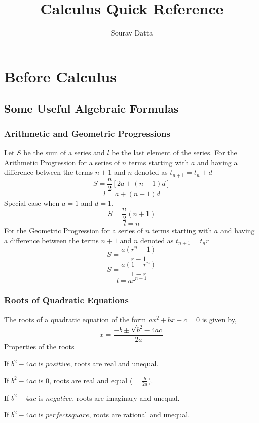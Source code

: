 \documentclass[a4paper]{book}
\title{\LARGE{Calculus Quick Reference}}
\author{Sourav Datta}
\date{}
\begin{document}
\maketitle

\part{Before Calculus}

\chapter{Some Useful Algebraic Formulas}

\section{Arithmetic and Geometric Progressions}
Let $S$ be the sum of a series and $l$ be the last element of the series. 
For the Arithmetic Progression for a series of $n$ terms starting with $a$ and having a difference between the terms $n+1$ and $n$ denoted as $t_{n+1} = t_{n} + d$
\begin{equation}
S = \frac{n}{2}[2a + (n - 1)d]
\end{equation}
\begin{equation}
l = a + (n - 1)d
\end{equation}
Special case when $a = 1$ and $d = 1$,
\begin{equation}
S = \frac{n}{2}(n + 1)
\end{equation}
\begin{equation}
l = n
\end{equation}
For the Geometric Progression for a series of $n$ terms starting with $a$ and having a difference between the terms $n+1$ and $n$ denoted as $t_{n+1} = t_{n}r$
\begin{equation}
S = \frac{a(r^{n} - 1)}{r - 1}
\end{equation}
\begin{equation}
S = \frac{a(1 - r^{n})}{1 - r}
\end{equation}
\begin{equation}
l = ar^{n - 1}
\end{equation}

\section{Roots of Quadratic Equations}
The roots of a quadratic equation of the form $ax^{2} + bx + c = 0$ is given by,
\begin{equation}
x = \frac{-b \pm \sqrt{b^{2} - 4ac}}{2a}
\end{equation}
Properties of the roots
\begin{description}
\item If $b^{2} - 4ac$ is $positive$, roots are real and unequal.
\item If $b^{2} - 4ac$ is $0$, roots are real and equal ($= \frac{b}{2a}$).
\item If $b^{2} - 4ac$ is $negative$, roots are imaginary and unequal.
\item If $b^{2} - 4ac$ is $perfect square$, roots are rational and unequal.
\end{description}
\end{document}
